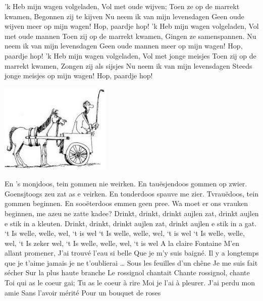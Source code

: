 \documentclass{article}
\begin{document}
    
\begin{songs}{}
\beginverse*
'k Heb mijn wagen volgeladen,
Vol met oude wijven;
Toen ze op de marrekt kwamen,
Begonnen zij te kijven
Nu neem ik van mijn levensdagen
Geen oude wijven meer op mijn wagen!
Hop, paardje hop!
\endverse
\beginverse*
'k Heb mijn wagen volgeladen,
Vol met oude mannen
Toen zij op de marrekt kwamen,
Gingen ze samenspannen.
Nu neem ik van mijn levensdagen
Geen oude mannen meer op mijn wagen!
Hop, paardje hop!
\endverse
\beginverse*
'k Heb mijn wagen volgeladen,
Vol met jonge meisjes
Toen zij op de marrekt kwamen,
Zongen zij als sijsjes
Nu neem ik van mijn levensdagen
Steeds jonge meisjes op mijn wagen!
Hop, paardje hop!
\endverse
\endsong
\begin{intersong}
    \includegraphics[width=0.4\textwidth]{img1}
\end{intersong}
\beginverse*
En 's monjdoos, tein gommen nie weirken.
En tauësjendoos gommen op zwier.
Goensjtoogs zeu zat as e veirken.
En tonderdoos spauve me zier.
Tvrauëdoos, tein gommen beginnen.
En sooëterdoos emmen geen pree.
Wa moet er ons vrauken beginnen,
me azeu ne zatte kadee?
\endverse
\beginverse*
Drinkt, drinkt, drinkt aujlen zat,
drinkt aujlen e stik in a kleuten.
Drinkt, drinkt, drinkt aujlen zat,
drinkt aujlen e stik in a gat.
\endverse
\endsong
{}
\beginverse*
‘t Is welle, welle, wel, ‘t is wel
‘t Is welle, welle, wel, ‘t is wel
‘t Is welle, welle, wel,
‘t Is zeker wel,
‘t Is welle, welle, wel, ‘t is wel
\endverse
\endsong
{}
\beginverse
A la claire Fontaine
M'en allant promener,
J'ai trouvé l'eau si belle
Que je m'y suis baigné.
\endverse
\beginchorus
Il y a longtemps que je t'aime
jamais je ne t'oublierai …
\endchorus
\beginverse
Sous les feuilles d'un chêne
Je me suis fait sécher
Sur la plus haute branche
Le rossignol chantait
\endverse
\beginverse
Chante rossignol, chante
Toi qui as le coeur gai;
Tu as le coeur à rire
Moi je l'ai à pleurer.
\endverse
\beginverse
J'ai perdu mon amie
Sans l'avoir mérité
Pour un bouquet de roses

\end{songs}
\end{document}
